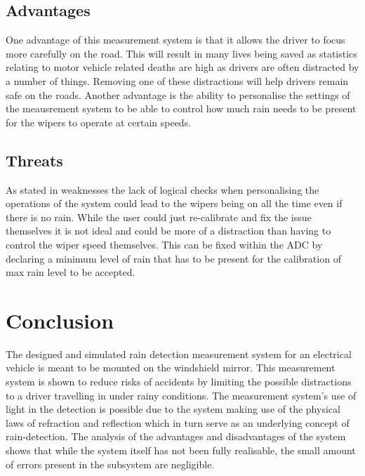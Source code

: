\documentclass[conference, 11pt]{IEEEtran}
\begin{document}
\subsection{Advantages}
One advantage of this measurement system is that it allows the driver to focus more carefully on the road. This will result in many lives being saved as statistics relating to motor vehicle related deaths are high as drivers are often distracted by a number of things. Removing one of these distractions will help drivers remain safe on the roads. Another advantage is the ability to personalise the settings of the meausrement system to be able to control how much rain needs to be present for the wipers to operate at certain speeds.

\subsection{Threats}
As stated in weaknesses the lack of logical checks when personalising the operations of the system could lead to the wipers being on all the time even if there is no rain. While the user could just re-calibrate and fix the issue themselves it is not ideal and could be more of a distraction than having to control the wiper speed themselves. This can be fixed within the ADC by declaring a minimum level of rain that has to be present for the calibration of max rain level to be accepted.



\section{Conclusion}
The designed and simulated  rain detection measurement system for an electrical vehicle is meant to be mounted on the windshield mirror. This measurement system is shown to reduce risks of accidents by limiting the possible distractions to a driver travelling in under rainy conditions. The measurement system's use of light in the detection is possible due to the system making use of the physical laws of refraction and reflection which in turn serve as an underlying concept of rain-detection. The analysis of the advantages and disadvantages of the system shows that while the system itself has not been fully realisable, the small amount of errors present in the subsystem are negligible.
\end{document}
